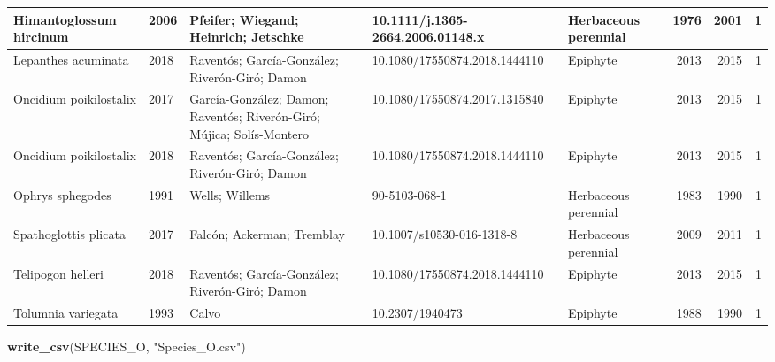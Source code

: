 \documentclass[
]{book}
\newenvironment{Shaded}{\begin{snugshade}}{\end{snugshade}}
\newcommand{\FunctionTok}[1]{\textcolor[rgb]{0.13,0.29,0.53}{\textbf{#1}}}
\newcommand{\NormalTok}[1]{#1}
\newcommand{\StringTok}[1]{\textcolor[rgb]{0.31,0.60,0.02}{#1}}
\theoremstyle{definition}
\theoremstyle{definition}
\theoremstyle{definition}
\theoremstyle{definition}
\theoremstyle{remark}
\begin{document}
\begin{tabular}{l|l|l|l|l|r|r|r}
\hline
Himantoglossum hircinum & 2006 & Pfeifer; Wiegand; Heinrich; Jetschke & 10.1111/j.1365-2664.2006.01148.x & Herbaceous perennial & 1976 & 2001 & 1\\
\hline
Lepanthes acuminata & 2018 & Raventós; García-González; Riverón-Giró; Damon & 10.1080/17550874.2018.1444110 & Epiphyte & 2013 & 2015 & 1\\
\hline
Oncidium poikilostalix & 2017 & García-González; Damon; Raventós; Riverón-Giró; Mújica; Solís-Montero & 10.1080/17550874.2017.1315840 & Epiphyte & 2013 & 2015 & 1\\
\hline
Oncidium poikilostalix & 2018 & Raventós; García-González; Riverón-Giró; Damon & 10.1080/17550874.2018.1444110 & Epiphyte & 2013 & 2015 & 1\\
\hline
Ophrys sphegodes & 1991 & Wells; Willems & 90-5103-068-1 & Herbaceous perennial & 1983 & 1990 & 1\\
\hline
Spathoglottis plicata & 2017 & Falcón; Ackerman; Tremblay & 10.1007/s10530-016-1318-8 & Herbaceous perennial & 2009 & 2011 & 1\\
\hline
Telipogon helleri & 2018 & Raventós; García-González; Riverón-Giró; Damon & 10.1080/17550874.2018.1444110 & Epiphyte & 2013 & 2015 & 1\\
\hline
Tolumnia variegata & 1993 & Calvo & 10.2307/1940473 & Epiphyte & 1988 & 1990 & 1\\
\hline
\end{tabular}

\begin{Shaded}
\begin{Highlighting}[]
\FunctionTok{write\_csv}\NormalTok{(SPECIES\_O, }\StringTok{"Species\_O.csv"}\NormalTok{)}
\end{Highlighting}
\end{Shaded}
\end{document}
